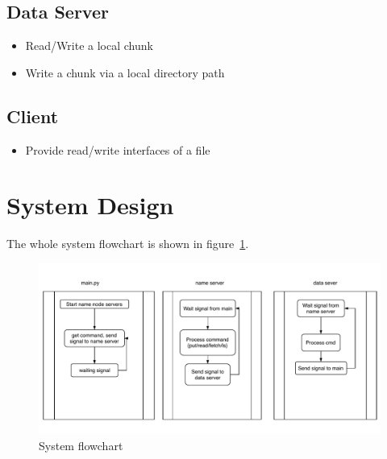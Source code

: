 \documentclass{article}
\begin{document}
\subsection{Data Server}
\begin{itemize}
    \item Read/Write a local chunk
    \item Write a chunk via a local directory path
\end{itemize}

\subsection{Client}
\begin{itemize}
    \item Provide read/write interfaces of a file
\end{itemize}

\section{System Design}
The whole system flowchart is shown in figure~\ref{fig:flowchart}.
\begin{figure}[tbh]
    \centering
    \includegraphics[scale=.8]{minidfs}
    \caption{System flowchart}
    \label{fig:flowchart}
\end{figure}
\end{document}
